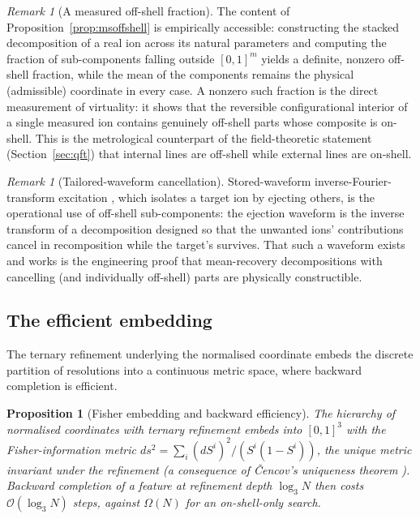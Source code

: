 \documentclass[11pt,a4paper]{article}
\theoremstyle{thmstyle}
\newtheorem{proposition}[theorem]{Proposition}
\theoremstyle{definition}
\theoremstyle{remark}
\newtheorem{remark}[theorem]{Remark}
\begin{document}
\begin{remark}[A measured off-shell fraction]
\label{rem:measuredfraction}
The content of Proposition~\ref{prop:msoffshell} is empirically accessible:
constructing the stacked decomposition of a real ion across its natural
parameters and computing the fraction of sub-components falling outside
$[0,1]^m$ yields a definite, nonzero off-shell fraction, while the mean of
the components remains the physical (admissible) coordinate in every case.
A nonzero such fraction is the direct measurement of virtuality: it shows
that the reversible configurational interior of a single measured ion
contains genuinely off-shell parts whose composite is on-shell. This is the
metrological counterpart of the field-theoretic statement
(Section~\ref{sec:qft}) that internal lines are off-shell while external
lines are on-shell.
\end{remark}

\begin{remark}[Tailored-waveform cancellation]
\label{rem:swift}
Stored-waveform inverse-Fourier-transform excitation
\citep{marshall1985}, which isolates a target ion by ejecting others, is
the operational use of off-shell sub-components: the ejection waveform is
the inverse transform of a decomposition designed so that the unwanted
ions' contributions cancel in recomposition while the target's survives.
That such a waveform exists and works is the engineering proof that
mean-recovery decompositions with cancelling (and individually off-shell)
parts are physically constructible.
\end{remark}

\subsection{The efficient embedding}
\label{sec:embedding}

The ternary refinement underlying the normalised coordinate embeds the
discrete partition of resolutions into a continuous metric space, where
backward completion is efficient.

\begin{proposition}[Fisher embedding and backward efficiency]
\label{prop:fisher}
The hierarchy of normalised coordinates with ternary refinement embeds into
$[0,1]^{3}$ with the Fisher-information metric
$ds^2=\sum_{i}(dS^i)^2/(S^i(1-S^i))$, the unique metric invariant under the
refinement (a consequence of \v{C}encov's uniqueness theorem
\citep{cencov1982,amari2016}). Backward completion of a feature at
refinement depth $\log_3 N$ then costs $\mathcal{O}(\log_3 N)$ steps,
against $\Omega(N)$ for an on-shell-only search.
\end{proposition}
\end{document}
